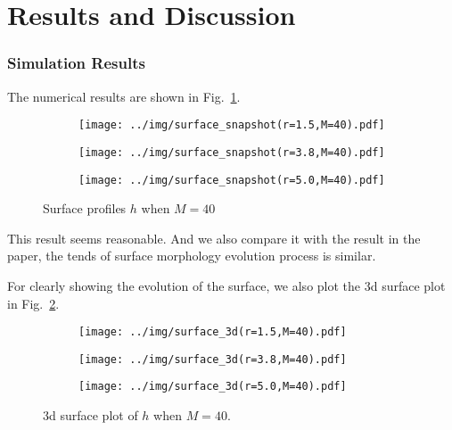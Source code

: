 \documentclass[runningheads]{llncs}
\begin{document}
\section{Results and Discussion}

\subsubsection{Simulation Results}

The numerical results are shown in Fig.~\ref{fig:1}.

\begin{figure}[!htbp]
    \centering
    \begin{subfigure}{.4\textwidth}
        \centering
        \texttt{[image: ../img/surface\_snapshot(r=1.5,M=40).pdf]}  
    \end{subfigure}
    \begin{subfigure}{.4\textwidth}
        \centering
        \texttt{[image: ../img/surface\_snapshot(r=3.8,M=40).pdf]}  
    \end{subfigure}
    \begin{subfigure}{.4\textwidth}
        \centering
        \texttt{[image: ../img/surface\_snapshot(r=5.0,M=40).pdf]}  
    \end{subfigure}
    \caption{Surface profiles $h$ when $M=40$}
    \label{fig:1}
\end{figure}
This result seems reasonable. 
And we also compare it with the result in the paper\cite{dong2023corrosion}, the tends of surface morphology evolution process is similar.

For clearly showing the evolution of the surface, we also plot the 3d surface plot in Fig.~\ref{fig:2}.

\begin{figure}[!htbp]
    \centering
    \begin{subfigure}{.4\textwidth}
        \centering
        \texttt{[image: ../img/surface\_3d(r=1.5,M=40).pdf]}  
    \end{subfigure}
    \begin{subfigure}{.4\textwidth}
        \centering
        \texttt{[image: ../img/surface\_3d(r=3.8,M=40).pdf]}  
    \end{subfigure}
    \begin{subfigure}{.4\textwidth}
        \centering
        \texttt{[image: ../img/surface\_3d(r=5.0,M=40).pdf]}  
    \end{subfigure}
    \caption{3d surface plot of $h$ when $M=40$.}
    \label{fig:2}
\end{figure}
\end{document}
